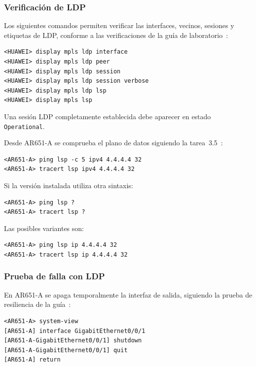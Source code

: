 \subsubsection{Verificación de LDP}

Los siguientes comandos permiten verificar las interfaces, vecinos, sesiones
y etiquetas de LDP, conforme a las verificaciones de la guía de laboratorio~\cite[tareas~3.3--3.4]{guia-mpls-ar651-s6730h}:

\begin{lstlisting}[style=terminal]
<HUAWEI> display mpls ldp interface
<HUAWEI> display mpls ldp peer
<HUAWEI> display mpls ldp session
<HUAWEI> display mpls ldp session verbose
<HUAWEI> display mpls ldp lsp
<HUAWEI> display mpls lsp
\end{lstlisting}

Una sesión LDP completamente establecida debe aparecer en estado
\texttt{Operational}.

Desde AR651-A se comprueba el plano de datos siguiendo la tarea~3.5~\cite[tarea~3.5]{guia-mpls-ar651-s6730h}:

\begin{lstlisting}[style=terminal]
<AR651-A> ping lsp -c 5 ipv4 4.4.4.4 32
<AR651-A> tracert lsp ipv4 4.4.4.4 32
\end{lstlisting}

Si la versión instalada utiliza otra sintaxis:

\begin{lstlisting}[style=terminal]
<AR651-A> ping lsp ?
<AR651-A> tracert lsp ?
\end{lstlisting}

Las posibles variantes son:

\begin{lstlisting}[style=terminal]
<AR651-A> ping lsp ip 4.4.4.4 32
<AR651-A> tracert lsp ip 4.4.4.4 32
\end{lstlisting}

\subsubsection{Prueba de falla con LDP}

En AR651-A se apaga temporalmente la interfaz de salida, siguiendo la prueba de resiliencia de la guía~\cite[tarea~3.6]{guia-mpls-ar651-s6730h}:

\begin{lstlisting}[style=terminal]
<AR651-A> system-view
[AR651-A] interface GigabitEthernet0/0/1
[AR651-A-GigabitEthernet0/0/1] shutdown
[AR651-A-GigabitEthernet0/0/1] quit
[AR651-A] return
\end{lstlisting}

